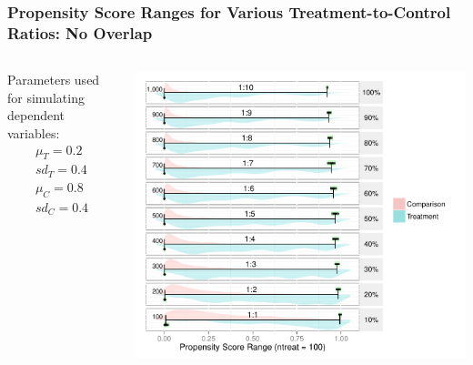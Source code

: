 \documentclass[10pt,handout,mathserif]{beamer}
\begin{document}
\begin{frame}[c]
	\frametitle{Propensity Score Ranges for Various Treatment-to-Control Ratios: No Overlap}
	\begin{columns}
    \begin{column}{0.15\textwidth}
        Parameters used for simulating dependent variables:
    	\begin{equation*}
    	\begin{split}
    	\mu_T = 0.2\\
    	sd_T = 0.4\\
    	\mu_C = 0.8\\
    	sd_C = 0.4
    	\end{split}
    	\end{equation*}
    \end{column}
    \begin{column}{0.85\textwidth}
    	\begin{center}
    	\includegraphics[height=\textheight,keepaspectratio]{../Figures2009/PSRanges-NoOverlap}
    	\end{center}
	\end{column}
	\end{columns}
\end{frame}
\end{document}
